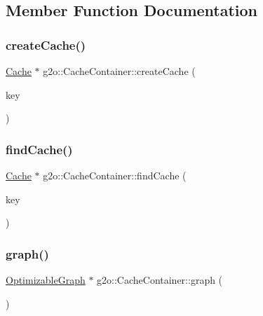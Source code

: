 \subsection{Member Function Documentation}
\mbox{\label{classg2o_1_1_cache_container_a08902c228901e06c4e08c5b594683a6c}} 
\subsubsection{\texorpdfstring{create\+Cache()}{createCache()}}
{\footnotesize\ttfamily \mbox{\hyperlink{classg2o_1_1_cache}{Cache}} $\ast$ g2o\+::\+Cache\+Container\+::create\+Cache (\begin{DoxyParamCaption}\item[{const \mbox{\hyperlink{classg2o_1_1_cache_1_1_cache_key}{Cache\+::\+Cache\+Key}} \&}]{key }\end{DoxyParamCaption})}

\mbox{\label{classg2o_1_1_cache_container_a2a0230117e0e71210f3d10a9e7143d0f}} 
\subsubsection{\texorpdfstring{find\+Cache()}{findCache()}}
{\footnotesize\ttfamily \mbox{\hyperlink{classg2o_1_1_cache}{Cache}} $\ast$ g2o\+::\+Cache\+Container\+::find\+Cache (\begin{DoxyParamCaption}\item[{const \mbox{\hyperlink{classg2o_1_1_cache_1_1_cache_key}{Cache\+::\+Cache\+Key}} \&}]{key }\end{DoxyParamCaption})}

\mbox{\label{classg2o_1_1_cache_container_a4bf79d27bb9ae377446dfa7fd048b06d}} 
\subsubsection{\texorpdfstring{graph()}{graph()}}
{\footnotesize\ttfamily \mbox{\hyperlink{structg2o_1_1_optimizable_graph}{Optimizable\+Graph}} $\ast$ g2o\+::\+Cache\+Container\+::graph (\begin{DoxyParamCaption}{ }\end{DoxyParamCaption})}

